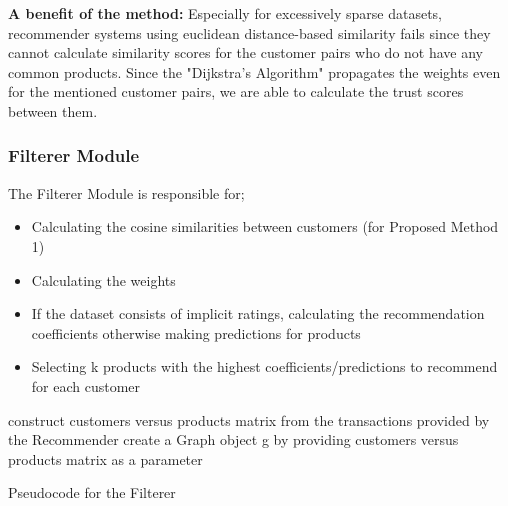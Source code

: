 \textbf{A benefit of the method:} Especially for excessively sparse datasets, recommender systems using euclidean distance-based similarity fails since they cannot calculate similarity scores for the customer pairs who do not have any common products.	Since the  "Dijkstra's Algorithm" propagates the weights even for the mentioned customer pairs, we are able to calculate the trust scores between them.

\subsubsection{Filterer Module} The Filterer Module is responsible for;
\begin{itemize}
	\item Calculating the cosine similarities between customers (for Proposed Method 1)
	\item Calculating the weights
	\item If the dataset consists of implicit ratings, calculating the recommendation coefficients otherwise making predictions for products
	\item Selecting k products with the highest coefficients/predictions to recommend for each customer
\end{itemize}

{
	\center
	\begin{algorithm}[H]
		\NoCaptionOfAlgo
		\SetAlgoLined
		construct customers versus products matrix from the transactions provided by the Recommender\;
		create a Graph object g by providing customers versus products matrix as a parameter\;
		\caption{Pseudocode for the Filterer}
	\end{algorithm}
}

